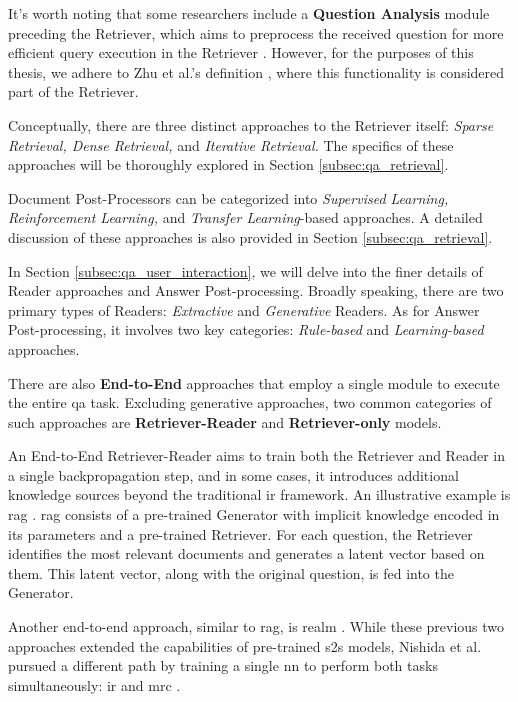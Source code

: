It's worth noting that some researchers include a \textbf{Question Analysis} module preceding the Retriever, which aims to preprocess the received question for more efficient query execution in the Retriever \cite{nassiri_transformer_2023}. However, for the purposes of this thesis, we adhere to Zhu et al.'s definition \cite{zhu_retrieving_2021}, where this functionality is considered part of the Retriever.

Conceptually, there are three distinct approaches to the Retriever itself: \textit{Sparse Retrieval, Dense Retrieval,} and \textit{Iterative Retrieval.} The specifics of these approaches will be thoroughly explored in Section \ref{subsec:qa_retrieval}.

Document Post-Processors can be categorized into \textit{Supervised Learning, Reinforcement Learning,} and \textit{Transfer Learning}-based approaches. A detailed discussion of these approaches is also provided in Section \ref{subsec:qa_retrieval}.

In Section \ref{subsec:qa_user_interaction}, we will delve into the finer details of Reader approaches and Answer Post-processing. Broadly speaking, there are two primary types of Readers: \textit{Extractive} and \textit{Generative} Readers. As for Answer Post-processing, it involves two key categories: \textit{Rule-based} and \textit{Learning-based} approaches.

There are also \textbf{End-to-End} approaches that employ a single module to execute the entire \gls{qa} task. Excluding generative approaches, two common categories of such approaches are \textbf{Retriever-Reader} and \textbf{Retriever-only} models.

An End-to-End Retriever-Reader aims to train both the Retriever and Reader in a single backpropagation step, and in some cases, it introduces additional knowledge sources beyond the traditional \gls{ir} framework. An illustrative example is \gls{rag} \cite{lewis_retrieval-augmented_2021}. \gls{rag} consists of a pre-trained Generator with implicit knowledge encoded in its parameters and a pre-trained Retriever. For each question, the Retriever identifies the most relevant documents and generates a latent vector based on them. This latent vector, along with the original question, is fed into the Generator.

Another end-to-end approach, similar to \gls{rag}, is \gls{realm} \cite{guu_realm_2020}. While these previous two approaches extended the capabilities of pre-trained \gls{s2s} models, Nishida et al. pursued a different path by training a single \gls{nn} to perform both tasks simultaneously: \gls{ir} and \gls{mrc} \cite{nishida_retrieve-and-read_2018}.

